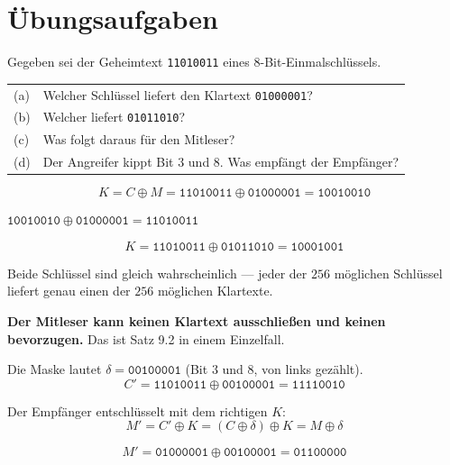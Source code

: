 \section{Übungsaufgaben}

\begin{aufgabe}
Gegeben sei der Geheimtext \texttt{11010011} eines $8$-Bit-Einmalschlüssels.
\begin{center}
{\small
\renewcommand{\arraystretch}{1.4}
\begin{tabular}{@{}P{0.8cm}P{7.6cm}@{}}
\toprule
(a) & Welcher Schlüssel liefert den Klartext \texttt{01000001}?\\
(b) & Welcher liefert \texttt{01011010}?\\
(c) & Was folgt daraus für den Mitleser?\\
(d) & Der Angreifer kippt Bit $3$ und $8$. Was empfängt der Empfänger?\\
\bottomrule
\end{tabular}}
\end{center}

\loesung
{}
\[ K = C \oplus M = \texttt{11010011} \oplus \texttt{01000001} = \texttt{10010010} \]

 $\texttt{10010010}\oplus\texttt{01000001} = \texttt{11010011}$ \checkmark

\[ K = \texttt{11010011} \oplus \texttt{01011010} = \texttt{10001001} \]

Beide Schlüssel sind gleich wahrscheinlich --- jeder der $256$ möglichen Schlüssel liefert genau einen der $256$ möglichen Klartexte.

\begin{center}
\begin{minipage}{0.9\textwidth}
\textbf{Der Mitleser kann keinen Klartext ausschließen und keinen bevorzugen.} Das ist Satz 9.2 in einem Einzelfall.
\end{minipage}
\end{center}

Die Maske lautet $\delta = \texttt{00100001}$ (Bit $3$ und $8$, von links gezählt).
\[ C' = \texttt{11010011}\oplus\texttt{00100001} = \texttt{11110010} \]

Der Empfänger entschlüsselt mit dem richtigen $K$:
\[ M' = C'\oplus K = (C\oplus\delta)\oplus K = M \oplus \delta \]

\[ M' = \texttt{01000001}\oplus\texttt{00100001} = \texttt{01100000} \]


\end{aufgabe}
